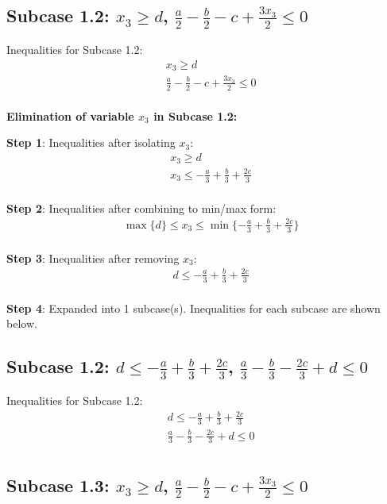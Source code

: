 \documentclass{article}
\begin{document}
\subsection{Subcase 1.2: $x_{3} \geq d$, $\frac{a}{2} - \frac{b}{2} - c + \frac{3 x_{3}}{2} \leq 0$}

Inequalities for Subcase 1.2:
\begin{align}
& x_{3} \geq d \\
& \frac{a}{2} - \frac{b}{2} - c + \frac{3 x_{3}}{2} \leq 0 \\
\end{align}

\textbf{Elimination of variable $x_{3}$ in Subcase 1.2:}

\textbf{Step 1}: Inequalities after isolating $x_{3}$:
\begin{align}
& x_{3} \geq d \\
& x_{3} \leq - \frac{a}{3} + \frac{b}{3} + \frac{2 c}{3} \\
\end{align}

\textbf{Step 2}: Inequalities after combining to min/max form:
\begin{align}
& \max\{d\} \leq x_{3} \leq \min\{- \frac{a}{3} + \frac{b}{3} + \frac{2 c}{3}\} \\
\end{align}

\textbf{Step 3}: Inequalities after removing $x_{3}$:
\begin{align}
& d \leq - \frac{a}{3} + \frac{b}{3} + \frac{2 c}{3} \\
\end{align}

\textbf{Step 4}: Expanded into 1 subcase(s). Inequalities for each subcase are shown below.

\subsection{Subcase 1.2: $d \leq - \frac{a}{3} + \frac{b}{3} + \frac{2 c}{3}$, $\frac{a}{3} - \frac{b}{3} - \frac{2 c}{3} + d \leq 0$}

Inequalities for Subcase 1.2:
\begin{align}
& d \leq - \frac{a}{3} + \frac{b}{3} + \frac{2 c}{3} \\
& \frac{a}{3} - \frac{b}{3} - \frac{2 c}{3} + d \leq 0 \\
\end{align}

\subsection{Subcase 1.3: $x_{3} \geq d$, $\frac{a}{2} - \frac{b}{2} - c + \frac{3 x_{3}}{2} \leq 0$}
\end{document}
